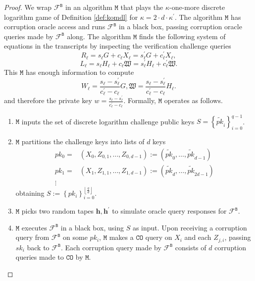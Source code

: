 \documentclass{llncs}
\newcommand{\B}{\texttt{B}}
\begin{document}
\begin{proof}
We wrap $\mathcal{F}^{\B}$ in an algorithm $\texttt{M}$ that plays the $\kappa$-one-more discrete logarithm game of Definition \ref{def:komdl} for $\kappa = 2\cdot d \cdot \kappa^\prime$. The algorithm $\texttt{M}$ has corruption oracle access and runs $\mathcal{F}^{\B}$ in a black box, passing corruption oracle queries made by $\mathcal{F}^{\B}$ along. The algorithm $\texttt{M}$ finds the following system of equations in the transcripts by inspecting the verification challenge queries
\[R_\ell = s_\ell G + c_\ell X_\ell = s_\ell^\prime G + c_\ell^\prime X_\ell,\]
\[L_\ell = s_\ell H_\ell + c_\ell \mathfrak{W} = s_\ell^\prime H_\ell + c_\ell^\prime \mathfrak{W}.\] This $\texttt{M}$ has enough information to compute
\[ W_\ell = \frac{s_\ell - s_\ell^\prime}{c_\ell^\prime - c_\ell} G,  \mathfrak{W} = \frac{s_\ell - s_\ell^\prime}{c_\ell^\prime - c_\ell} H_\ell.\]
and therefore the private key $w = \frac{s_{\ell} - s_\ell^\prime}{c_\ell^\prime - c_\ell}$. Formally, $\texttt{M}$ operates as follows.

\begin{enumerate}[(1)]
\item $\texttt{M}$ inputs the set of discrete logarithm challenge public keys $S = \left\{\widetilde{pk}_i\right\}_{i=0}^{q-1}$.

\item $\texttt{M}$ partitions the challenge keys into lists of $d$ keys
\begin{align*}
pk_0 =&  (X_0, Z_{0, 1}, \ldots, Z_{0, d-1}) := (\widetilde{pk}_0, \ldots, \widetilde{pk}_{d-1}) \\
pk_1 =& (X_1, Z_{1, 1}, \ldots, Z_{1, d-1}) := (\widetilde{pk}_d, \ldots, \widetilde{pk}_{2d-1}) \\
\vdots
\end{align*} obtaining $S := \left\{pk_i\right\}_{i=0}^{\left\lfloor \frac{q}{d}\right\rfloor}$.

\item $\texttt{M}$ picks two random tapes $\textbf{h}, \textbf{h}^\prime$ to simulate oracle query responses for $\mathcal{F}^{\B}$.

\item $\texttt{M}$ executes $\mathcal{F}^{\B}$ in a black box, using $S$ as input. Upon receiving a corruption query from $\mathcal{F}^{\B}$ on some $pk_i$, $\texttt{M}$ makes a $\texttt{CO}$ query on $X_i$ and each $Z_{j,i}$, passing $sk_i$ back to $\mathcal{F}^{\B}$. Each corruption query made by $\mathcal{F}^{\B}$ consists of $d$ corruption queries made to $\texttt{CO}$ by $\texttt{M}$.


\end{enumerate}
\end{proof}
\end{document}
